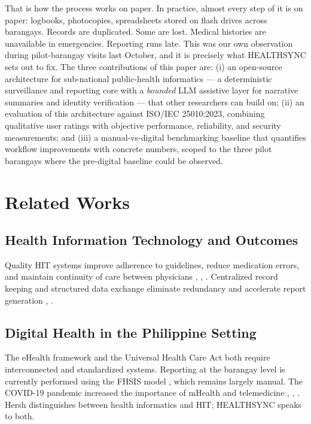 \documentclass[conference]{IEEEtran}
\begin{document}
That is how the process works on paper. In practice, almost every step of it is on paper: logbooks, photocopies, spreadsheets stored on flash drives across barangays. Records are duplicated. Some are lost. Medical histories are unavailable in emergencies. Reporting runs late. This was our own observation during pilot-barangay visits last October, and it is precisely what HEALTHSYNC sets out to fix. The three contributions of this paper are: (i) an open-source architecture for sub-national public-health informatics --- a deterministic surveillance and reporting core with a \textit{bounded} LLM assistive layer for narrative summaries and identity verification --- that other researchers can build on; (ii) an evaluation of this architecture against ISO/IEC 25010:2023, combining qualitative user ratings with objective performance, reliability, and security measurements; and (iii) a manual-vs-digital benchmarking baseline that quantifies workflow improvements with concrete numbers, scoped to the three pilot barangays where the pre-digital baseline could be observed.

\section{Related Works}

\subsection{Health Information Technology and Outcomes}
Quality HIT systems improve adherence to guidelines, reduce medication errors, and maintain continuity of care between physicians \cite{b10}, \cite{b11}, \cite{b12}. Centralized record keeping and structured data exchange eliminate redundancy and accelerate report generation \cite{b13}, \cite{b14}.

\subsection{Digital Health in the Philippine Setting}
The eHealth framework \cite{b5} and the Universal Health Care Act \cite{b15} both require interconnected and standardized systems. Reporting at the barangay level is currently performed using the FHSIS model \cite{b16}, which remains largely manual. The COVID-19 pandemic increased the importance of mHealth and telemedicine \cite{b2}, \cite{b17}, \cite{b18}. Hersh \cite{b19} distinguishes between health informatics and HIT; HEALTHSYNC speaks to both.
\end{document}
